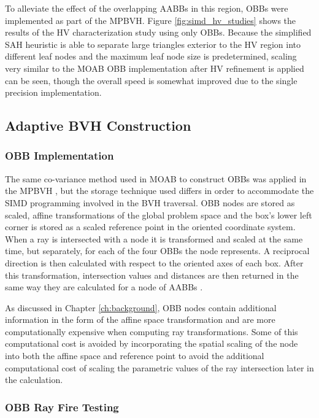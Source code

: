 To alleviate the effect of the overlapping AABBs in this region, OBBs were
implemented as part of the MPBVH. Figure \ref{fig:simd_hv_studies} shows the
results of the HV characterization study using only OBBs. Because the simplified SAH heuristic is able to separate
large triangles exterior to the HV region into different leaf nodes and the
maximum leaf node size is predetermined, scaling very similar to the MOAB OBB
implementation after HV refinement is applied can be seen, though the overall
speed is somewhat improved due to the single precision implementation.

\subsection{Adaptive BVH Construction}

\subsubsection{OBB Implementation}

The same co-variance method used in MOAB to construct OBBs was applied in the
MPBVH \cite{Weghorst_1984}, but the storage technique used differs in order to
accommodate the SIMD programming involved in the BVH traversal. OBB nodes are
stored as scaled, affine transformations of the global problem space and the
box's lower left corner is stored as a scaled reference point in the oriented
coordinate system. When a ray is intersected with a node it is transformed and
scaled at the same time, but separately, for each of the four OBBs the node
represents. A reciprocal direction is then calculated with respect to the
oriented axes of each box. After this transformation, intersection values and
distances are then returned in the same way they are calculated for a node of
AABBs \cite{Wald_2014}.

As discussed in Chapter \ref{ch:background}, OBB nodes contain additional
information in the form of the affine space transformation and are more
computationally expensive when computing ray transformations. Some of this
computational cost is avoided by incorporating the spatial scaling of the node
into both the affine space and reference point to avoid the additional
computational cost of scaling the parametric values of the ray intersection
later in the calculation.

\subsubsection{OBB Ray Fire Testing}


